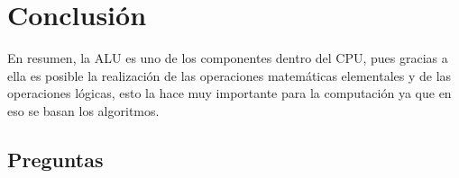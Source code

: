 \documentclass[12pt, letterpaper]{article}
\begin{document}
    \section{Conclusión}

      \hspace{.5cm}
      En resumen, la ALU es uno de los componentes dentro del CPU, pues gracias
      a ella es posible la realización de las operaciones matemáticas elementales
      y de las operaciones lógicas, esto la hace muy importante para la
      computación ya que en eso se basan los algoritmos.\\
      
      \subsection{Preguntas}
\end{document}
